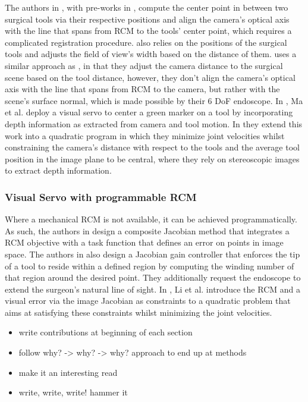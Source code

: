 The authors in \cite{eslamian2020development, mariani2020experimental, dascan}, with pre-works in \cite{Eslamian2016TowardsTI, eslamian2017autonomous}, compute the center point in between two surgical tools via their respective positions and align the camera's optical axis with the line that spans from RCM to the tools' center point, which requires a complicated registration procedure. \cite{yu2016automatic} also relies on the positions of the surgical tools and adjusts the field of view's width based on the distance of them. \cite{abdelaal2020orientation} uses a similar approach as \cite{eslamian2020development}, in that they adjust the camera distance to the surgical scene based on the tool distance, however, they don't align the camera's optical axis with the line that spans from RCM to the camera, but rather with the scene's surface normal, which is made possible by their 6 DoF endoscope. In \cite{ma2019autonomous}, Ma et al. deploy a visual servo to center a green marker on a tool by incorporating depth information as extracted from camera and tool motion. In \cite{ma2020visual} they extend this work into a quadratic program in which they minimize joint velocities whilst constraining the camera's distance with respect to the tools and the average tool position in the image plane to be central, where they rely on stereoscopic images to extract depth information. 

\subsubsection{Visual Servo with programmable RCM}
Where a mechanical RCM is not available, it can be achieved programmatically. As such, the authors in \cite{aghakhani2013task} design a composite Jacobian method that integrates a RCM objective with a task function that defines an error on points in image space. The authors in \cite{yang2019adaptive} also design a Jacobian gain controller that enforces the tip of a tool to reside within a defined region by computing the winding number of that region around the desired point. They additionally request the endoscope to extend the surgeon's natural line of sight. In \cite{li2020accelerated}, Li et al. introduce the RCM and a visual error via the image Jacobian as constraints to a quadratic problem that aims at satisfying these constraints whilst minimizing the joint velocities. 

\begin{itemize}
    \item write contributions at beginning of each section
    \item follow why? -> why? -> why? approach to end up at methods
    \item make it an interesting read
    \item write, write, write! hammer it
\end{itemize}


